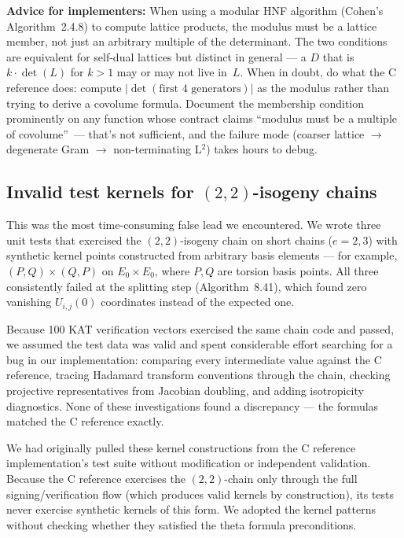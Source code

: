\noindent
\textbf{Advice for implementers:} When using a modular HNF
algorithm (Cohen's Algorithm~2.4.8) to compute lattice
products, the modulus must be a lattice member, not just an
arbitrary multiple of the determinant.  The two conditions are
equivalent for self-dual lattices but distinct in general --- a
$D$ that is~$k \cdot \det(L)$ for $k > 1$ may or may not live
in~$L$.  When in doubt, do what the C reference does: compute
$|\det(\text{first 4 generators})|$ as the modulus rather than
trying to derive a covolume formula.  Document the membership
condition prominently on any function whose contract claims
``modulus must be a multiple of covolume''~--- that's not
sufficient, and the failure mode (coarser lattice $\to$
degenerate Gram $\to$ non-terminating L$^2$) takes hours to
debug.

\subsection{Invalid test kernels for $(2,2)$-isogeny chains}
\label{sec:bug-theta-tests}

This was the most time-consuming false lead we encountered.  We
wrote three unit tests that exercised the $(2,2)$-isogeny chain on
short chains ($e = 2, 3$) with synthetic kernel points constructed
from arbitrary basis elements --- for example, $(P, Q) \times (Q,
P)$ on $E_0 \times E_0$, where $P, Q$ are torsion basis points.
All three consistently failed at the splitting step
(Algorithm~8.41), which found zero vanishing $U_{i,j}(0)$
coordinates instead of the expected one.

Because 100 KAT verification vectors exercised the same chain code
and passed, we assumed the test data was valid and spent
considerable effort searching for a bug in our implementation:
comparing every intermediate value against the C reference, tracing
Hadamard transform conventions through the chain, checking
projective representatives from Jacobian doubling, and adding
isotropicity diagnostics.  None of these investigations found a
discrepancy --- the formulas matched the C reference exactly.

We had originally pulled these kernel constructions from the C
reference implementation's test suite without modification or
independent validation.  Because the C reference exercises the
$(2,2)$-chain only through the full signing/verification flow
(which produces valid kernels by construction), its tests never
exercise synthetic kernels of this form.  We adopted the kernel
patterns without checking whether they satisfied the theta
formula preconditions.

